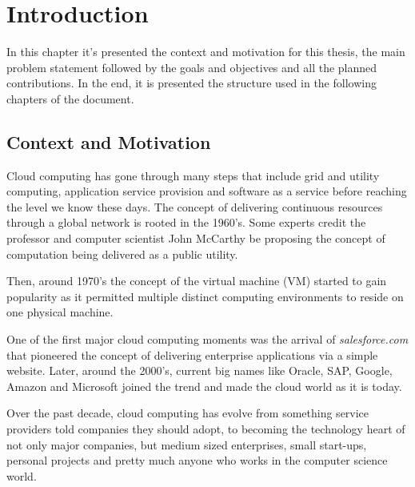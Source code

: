 \newcommand{\novathesis}{\emph{novathesis}}
\newcommand{\novathesisclass}{\texttt{novathesis.cls}}


\chapter{Introduction}
\label{cha:introduction}

In this chapter it's presented the context and motivation for this thesis, the main problem statement followed by the goals and objectives and all the planned contributions. In the end, it is presented the structure used in the following chapters of the document.

\section{Context and Motivation} %
\label{sec:context_and_motivation}

Cloud computing has gone through many steps that include grid and utility computing, application service provision and software as a service before reaching the level we know these days. The concept of delivering continuous resources through a global network is rooted in the 1960's. Some experts credit the professor and computer scientist John McCarthy \cite{john_mcCarthy:1} be proposing the concept of computation being delivered as a public utility.

Then, around 1970's the concept of the virtual machine (\gls{VM}) started to gain popularity as it permitted multiple distinct computing environments to reside on one physical machine.

One of the first major cloud computing moments was the arrival of \textit{salesforce.com} that pioneered the concept of delivering enterprise applications via a simple website. Later, around the 2000's, current big names like Oracle, SAP, Google, Amazon and Microsoft joined the trend and made the cloud world as it is today. \cite{cloud_history:1} \cite{cloud_history:2}

Over the past decade, cloud computing has evolve from something service providers told companies they should adopt, to becoming the technology heart of not only major companies, but medium sized enterprises, small start-ups, personal projects and pretty much anyone who works in the computer science world. 

